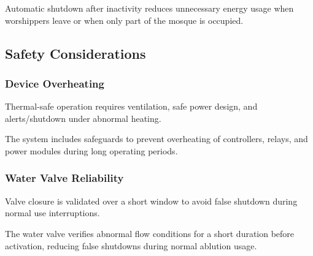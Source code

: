 Automatic shutdown after inactivity reduces unnecessary energy usage when worshippers leave or when only part of the mosque is occupied.

\subsection{Safety Considerations}

\subsubsection{Device Overheating}
Thermal-safe operation requires ventilation, safe power design, and alerts/shutdown under abnormal heating.

The system includes safeguards to prevent overheating of controllers, relays, and power modules during long operating periods.

\subsubsection{Water Valve Reliability}
Valve closure is validated over a short window to avoid false shutdown during normal use interruptions.

The water valve verifies abnormal flow conditions for a short duration before activation, reducing false shutdowns during normal ablution usage.